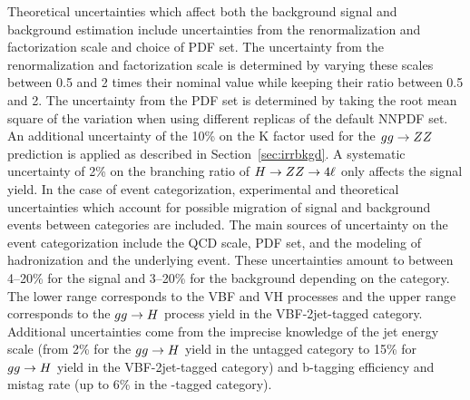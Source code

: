Theoretical uncertainties which affect both the background signal and background estimation 
include uncertainties from the renormalization and factorization scale and choice of PDF set. 
The uncertainty from the renormalization and factorization scale is determined by varying these scales between 
0.5 and 2 times their nominal value while keeping their ratio between 0.5 and 2. 
The uncertainty from the PDF set is determined 
by taking the root mean square of the variation when using different replicas of the default NNPDF set. An additional
uncertainty of the 10\% on the K factor used for the $gg\to ZZ$ prediction is applied as described in Section~\ref{sec:irrbkgd}.
A systematic uncertainty of 2\% on the branching ratio of $H\to ZZ\to4\ell$ only affects the signal yield. 
In the case of event categorization, experimental and theoretical uncertainties which account for
possible migration of signal and background events between categories are included. The main sources 
of uncertainty on the event categorization include the QCD scale, PDF set, and the modeling of hadronization and the underlying 
event. These uncertainties amount to between 4--20\% for the signal and 3--20\% for the background depending on the category.
The lower range corresponds to the VBF and VH processes and the upper range corresponds to the $gg\to H$ process yield in the VBF-2jet-tagged category. 
Additional uncertainties come from the imprecise knowledge of the jet energy scale (from 2\% for the $gg\to H$ yield in the untagged category to 15\% for  $gg\to H$ yield in the VBF-2jet-tagged category) and b-tagging efficiency and mistag 
rate (up to 6\% in the -tagged category). 


